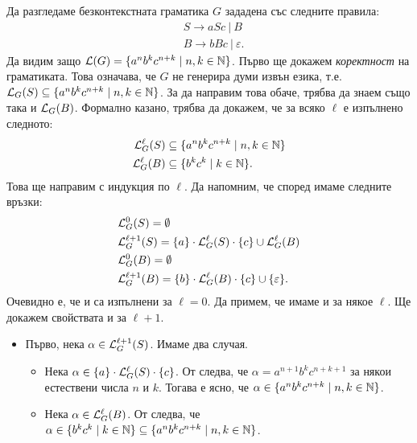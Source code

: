 \begin{extra}
\begin{example}
  Да разгледаме безконтекстната граматика $G$ зададена със следните правила:
  \begin{align*}
    & S \to aSc\ |\  B\\
    & B \to bBc\ |\ \varepsilon.
  \end{align*}
  Да видим защо $\mathcal{L}(G) = \{a^nb^kc^{n+k} \mid n,k\in\mathbb{N}\}$.
  Първо ще докажем \emph{коректност} на граматиката. Това означава, че $G$ не генерира думи извън езика, т.е.
  $\mathcal{L}_G(S) \subseteq \{a^nb^kc^{n+k} \mid n,k\in\mathbb{N}\}$. За да направим това обаче, трябва да знаем също така и $\mathcal{L}_G(B)$.
  Формално казано, трябва да докажем, че за всяко $\ell$ е изпълнено следното:
  \begin{align}
    \mathcal{L}^\ell_G(S) & \subseteq \{a^nb^kc^{n+k} \mid n,k\in\mathbb{N}\} \label{eq:nknk1}\\
    \mathcal{L}^\ell_G(B) & \subseteq \{b^kc^k \mid k \in \mathbb{N}\} \label{eq:nknk2}.
  \end{align}
  Това ще направим с индукция по $\ell$.
  Да напомним, че според  имаме следните връзки:
  \begin{align*}
    & \mathcal{L}^0_G(S) = \emptyset\\
    & \mathcal{L}^{\ell+1}_G(S) = \{a\} \cdot \mathcal{L}^\ell_G(S) \cdot \{c\} \cup \mathcal{L}^\ell_G(B)\\
    & \mathcal{L}^0_G(B) = \emptyset\\
    & \mathcal{L}^{\ell+1}_G(B) = \{b\} \cdot \mathcal{L}^\ell_G(B) \cdot \{c\} \cup \{\varepsilon\}.
  \end{align*}
  Очевидно е, че  и  са изпълнени за $\ell = 0$.
  Да примем, че имаме  и  за някое $\ell$.
  Ще докажем свойствата и за $\ell+1$.
  \begin{itemize}
  \item
    Първо, нека $\alpha \in \mathcal{L}^{\ell+1}_G(S)$. Имаме два случая.
    \begin{itemize}
    \item
      Нека $\alpha \in \{a\} \cdot \mathcal{L}^\ell_G(S) \cdot \{c\}$. От \IndHyp следва, че
      $\alpha = a^{n+1}b^kc^{n+k+1}$ за някои естествени числа $n$ и $k$.
      Тогава е ясно, че $\alpha \in \{a^nb^kc^{n+k} \mid n,k\in\mathbb{N}\}$.
    \item
      Нека $\alpha \in  \mathcal{L}^\ell_G(B)$. От \IndHyp следва, че
      $\alpha \in \{b^kc^k \mid k \in \mathbb{N}\} \subseteq \{a^nb^kc^{n+k} \mid n,k\in\mathbb{N}\}$.

\end{itemize}
\end{itemize}
\end{example}
\end{extra}
